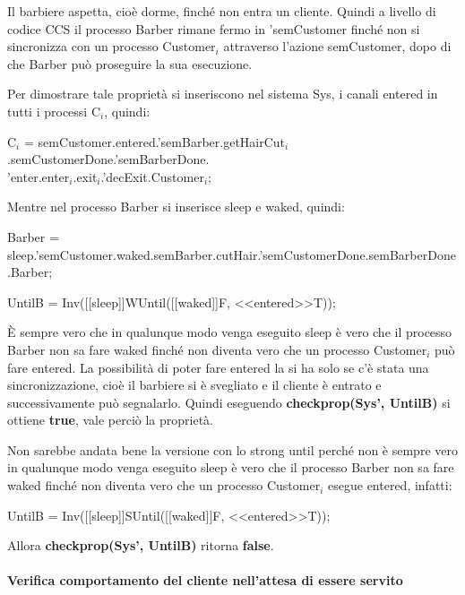 Il barbiere aspetta, cioè dorme, finché non entra un cliente. Quindi a livello di codice CCS il processo \textsf{Barber} rimane fermo in \textsf{'semCustomer} finché non si sincronizza con un processo \textsf{Customer$_{i}$} attraverso l'azione \textsf{semCustomer}, dopo di che \textsf{Barber} può proseguire la sua esecuzione.

Per dimostrare tale proprietà si inseriscono nel sistema \textsf{Sys}, i canali \textsf{entered} in tutti i processi \textsf{C$_{i}$}, quindi:

\textsf{C$_{i}$ = semCustomer.entered.'semBarber.getHairCut$_{i}$.semCustomerDone.'semBarberDone.}\\
\textsf{'enter.enter$_{i}$.exit$_{i}$.'decExit.Customer$_{i}$;}

Mentre nel processo \textsf{Barber} si inserisce \textsf{sleep} e \textsf{waked}, quindi:

\textsf{Barber = sleep.'semCustomer.waked.semBarber.cutHair.'semCustomerDone.semBarberDone.Barber;}

\begin{center}
	\textsf{UntilB = Inv([[sleep]]WUntil([[waked]]F, <<entered>>T));}
\end{center}

È sempre vero che in qualunque modo venga eseguito \textsf{sleep} è vero che il processo \textsf{Barber} non sa fare \textsf{waked} finché non diventa vero che un processo \textsf{Customer$_{i}$} può fare \textsf{entered}. La possibilità di poter fare \textsf{entered} la si ha solo se c'è stata una sincronizzazione, cioè il barbiere si è svegliato e il cliente è entrato e successivamente può segnalarlo. Quindi eseguendo \textbf{checkprop(Sys', UntilB)} si ottiene \textbf{true}, vale perciò la proprietà.

Non sarebbe andata bene la versione con lo strong until perché non è sempre vero in qualunque modo venga eseguito \textsf{sleep} è vero che il processo \textsf{Barber} non sa fare \textsf{waked} finché non diventa vero che un processo \textsf{Customer$_{i}$} esegue \textsf{entered}, infatti: 

\begin{center}
	 \textsf{UntilB = Inv([[sleep]]SUntil([[waked]]F, <<entered>>T));}
\end{center}

Allora \textbf{checkprop(Sys', UntilB)} ritorna \textbf{false}.
\pagebreak
\paragraph{Verifica comportamento del cliente nell'attesa di essere servito }\mbox{}

